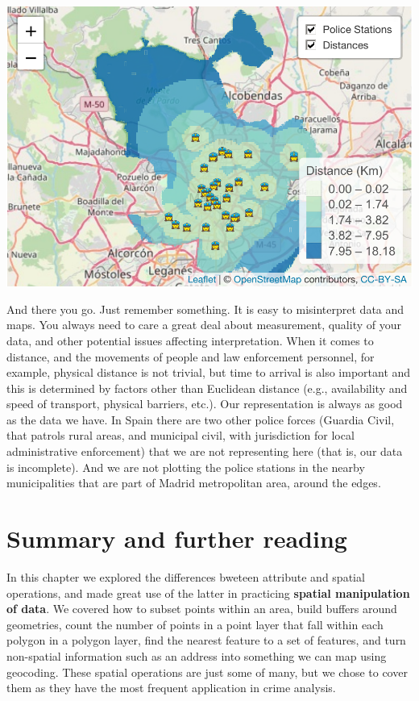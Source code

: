 \documentclass[
]{book}
\begin{document}
\includegraphics{crime_mapping_files/figure-latex/unnamed-chunk-74-1.pdf}

And there you go. Just remember something. It is easy to misinterpret data and maps. You always need to care a great deal about measurement, quality of your data, and other potential issues affecting interpretation. When it comes to distance, and the movements of people and law enforcement personnel, for example, physical distance is not trivial, but time to arrival is also important and this is determined by factors other than Euclidean distance (e.g., availability and speed of transport, physical barriers, etc.). Our representation is always as good as the data we have. In Spain there are two other police forces (Guardia Civil, that patrols rural areas, and municipal civil, with jurisdiction for local administrative enforcement) that we are not representing here (that is, our data is incomplete). And we are not plotting the police stations in the nearby municipalities that are part of Madrid metropolitan area, around the edges.

\hypertarget{summary-and-further-reading-1}{%
\section{Summary and further reading}\label{summary-and-further-reading-1}}

In this chapter we explored the differences bweteen attribute and spatial operations, and made great use of the latter in practicing \textbf{spatial manipulation of data}. We covered how to subset points within an area, build buffers around geometries, count the number of points in a point layer that fall within each polygon in a polygon layer, find the nearest feature to a set of features, and turn non-spatial information such as an address into something we can map using geocoding. These spatial operations are just some of many, but we chose to cover them as they have the most frequent application in crime analysis.
\end{document}

